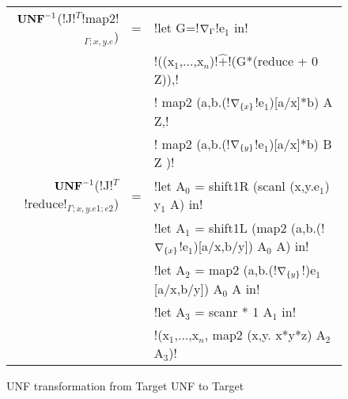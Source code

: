 \begin{figure*}[t]
\begin{tabular}{r c l}
    $\mathbf{UNF}^{-1}$(!J!$^T$!map2!$_{\Gamma;x,y.e}$) &=& !let G=!$\nabla_{\Gamma}$!e$_{1}$ in!\\
    && !((x$_{1}$,$\ldots$,x$_n$)!$\widehat{+}$!(G*(reduce + 0 Z)),!\\
    && ! map2 (a,b.(!$\nabla_{\{x\}}$!e$_{1}$)[a/x]*b) A Z,!\\
    && ! map2 (a,b.(!$\nabla_{\{y\}}$!e$_{1}$)[a/x]*b) B Z )!\\
    $\mathbf{UNF}^{-1}$(!J!$^T$!reduce!$_{\Gamma;x,y.e1;e2}$) &=& !let A$_{0}$ = shift1R (scanl (x,y.e$_{1}$) y$_{1}$ A) in! \\
    && !let A$_{1}$ = shift1L (map2 (a,b.(!$\nabla_{\{x\}}$!e$_{1}$)[a/x,b/y]) A$_{0}$ A) in! \\
    && !let A$_{2}$ = map2 (a,b.(!$\nabla_{\{y\}}$!)e$_{1}$[a/x,b/y]) A$_{0}$ A in! \\
    && !let A$_{3}$ = scanr * 1 A$_{1}$ in! \\
    && !(x$_{1}$,$\ldots$,x$_n$, map2 (x,y. x*y*z) A$_{2}$ A$_{3}$)! \\
    \end{tabular}
    \caption{UNF transformation from Target UNF to Target}
    \label{fig:unf_to_target}
    \end{figure*}